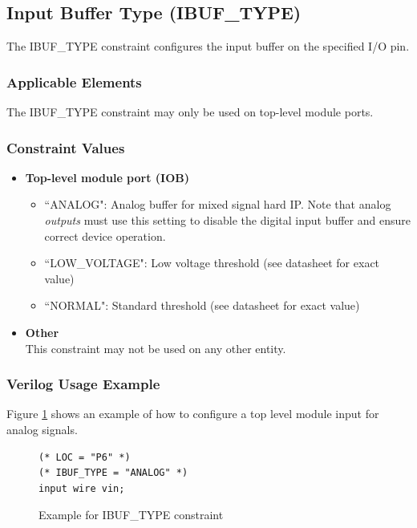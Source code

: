 \documentclass{article}
\begin{document}

\pagebreak
\subsection{Input Buffer Type (IBUF\_TYPE)}

The IBUF\_TYPE constraint configures the input buffer on the specified I/O pin.

\subsubsection{Applicable Elements}
The IBUF\_TYPE constraint may only be used on top-level module ports. 

\subsubsection{Constraint Values}
\begin{itemize}
\item {\bfseries Top-level module port (IOB)}
	\begin{itemize}
		\item ``ANALOG": Analog buffer for mixed signal hard IP. Note that analog \emph{outputs} must use this setting
		to disable the digital input buffer and ensure correct device operation.
		\item ``LOW\_VOLTAGE": Low voltage threshold (see datasheet for exact value)
		\item ``NORMAL": Standard threshold (see datasheet for exact value)
	\end{itemize}
\item {\bfseries Other} \\
This constraint may not be used on any other entity.
\end{itemize}

\subsubsection{Verilog Usage Example}

Figure \ref{constraint-ibuftype} shows an example of how to configure a top level module input for analog signals.

\begin{figure}[h]
\begin{lstlisting}
(* LOC = "P6" *)
(* IBUF_TYPE = "ANALOG" *)
input wire vin;
\end{lstlisting}
\caption{Example for IBUF\_TYPE constraint}
\label{constraint-ibuftype}
\end{figure}
\end{document}
